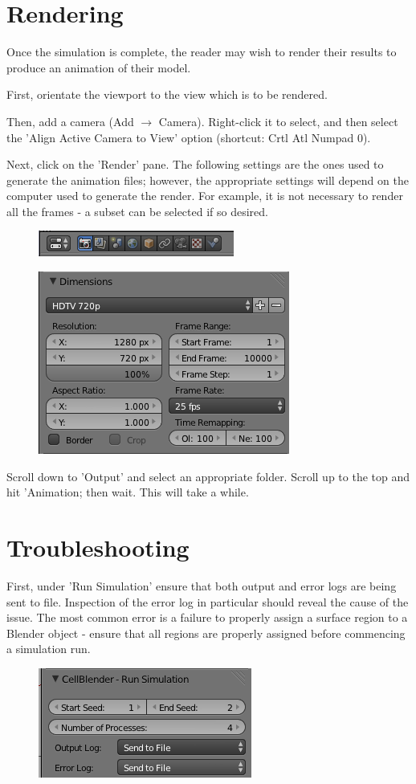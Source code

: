 \documentclass[twoside,a4paper]{refart}
\begin{document}
\section{Rendering}
Once the simulation is complete, the reader may wish to render their results to produce an animation of their model.

First, orientate the viewport to the view which is to be rendered.

Then, add a camera (Add $\to$ Camera). Right-click it to select, and then select the 'Align Active Camera to View' option (shortcut: Crtl Atl Numpad 0).

Next, click on the 'Render' pane. The following settings are the ones used to generate the animation files; however, the appropriate settings will depend on the computer used to generate the render. For example, it is not necessary to render all the frames - a subset can be selected if so desired.

\begin{figure}[H]
    \includegraphics[scale=0.5]{render1.png}
\end{figure}

\begin{figure}[H]
    \includegraphics[scale=0.5]{render2.png}
\end{figure}

Scroll down to 'Output' and select an appropriate folder. Scroll up to the top and hit 'Animation; then wait. This will take a while. 

\section{Troubleshooting}
 First, under 'Run Simulation' ensure that both output and error logs are being sent to file. Inspection of the error log in particular should reveal the cause of the issue. The most common error is a failure to properly assign a surface region to a Blender object - ensure that all regions are properly assigned before commencing a simulation run.

    \begin{figure}[H]
        \includegraphics[scale=0.5]{trouble1.png}
    \end{figure}
\end{document}
